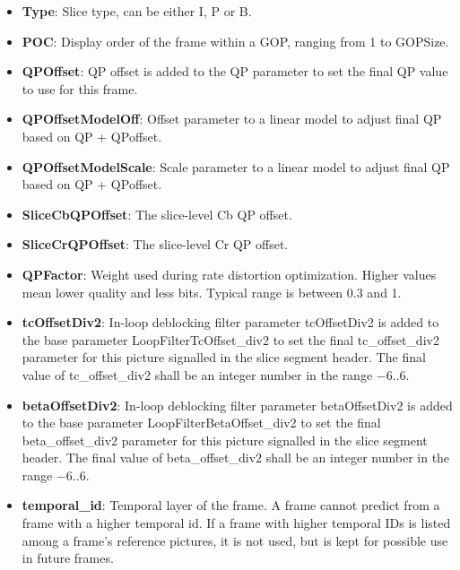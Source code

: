 \documentclass[a4paper,11pt]{jvetdoc}
\begin{document}
\begin{itemize}
\item[]\textbf{Type}: Slice type, can be either I, P or B.

\item[]\textbf{POC}: Display order of the frame within a GOP, ranging
from 1 to GOPSize.

\item[]\textbf{QPOffset}: QP offset is added to the QP parameter to set
the final QP value to use for this frame.

\item[]\textbf{QPOffsetModelOff}: Offset parameter to a linear model to adjust final QP based on QP + QPoffset.

\item[]\textbf{QPOffsetModelScale}: Scale parameter to a linear model to adjust final QP based on QP + QPoffset.

\item[]\textbf{SliceCbQPOffset}: The slice-level Cb QP offset.

\item[]\textbf{SliceCrQPOffset}: The slice-level Cr QP offset.

\item[]\textbf{QPFactor}: Weight used during rate distortion
optimization. Higher values mean lower quality and less bits. Typical
range is between
0.3 and 1.

\item[]\textbf{tcOffsetDiv2}: In-loop deblocking filter parameter tcOffsetDiv2 
is added to the base parameter LoopFilterTcOffset_div2 to set the final tc_offset_div2 
parameter for this picture signalled in the slice segment header. The final 
value of tc_offset_div2 shall be an integer number in the range $-6..6$.

\item[]\textbf{betaOffsetDiv2}: In-loop deblocking filter parameter betaOffsetDiv2 
is added to the base parameter LoopFilterBetaOffset_div2 to set the final beta_offset_div2 
parameter for this picture signalled in the slice segment header. The final 
value of beta_offset_div2 shall be an integer number in the range $-6..6$.

\item[]\textbf{temporal_id}: Temporal layer of the frame. A frame cannot
predict from a frame with a higher temporal id. If a frame with higher
temporal IDs is listed among a frame's reference pictures, it is
not used, but is kept for possible use in future frames.


\end{itemize}
\end{document}

